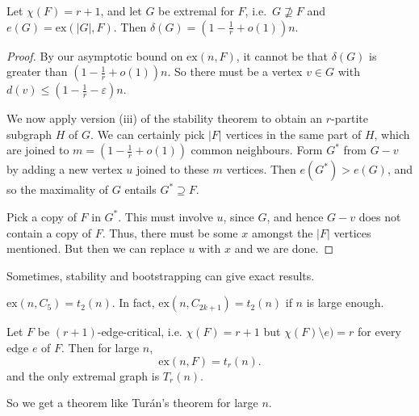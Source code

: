 \documentclass[a4paper]{article}
\renewcommand\ex{\mathrm{ex}}
\begin{document}
\begin{cor}
  Let $\chi(F) = r + 1$, and let $G$ be extremal for $F$, i.e.\ $G \not\supseteq F$ and $e(G) = \ex(|G|, F)$. Then $\delta(G) = \left(1 - \frac{1}{r} + o(1)\right)n$.
\end{cor}

\begin{proof}
  By our asymptotic bound on $\ex(n, F)$, it cannot be that $\delta(G)$ is greater than $\left(1 - \frac{1}{r} + o(1)\right)n$. So there must be a vertex $v \in G$ with $d(v) \leq \left(1 - \frac{1}{r} - \varepsilon\right) n$.

  We now apply version (iii) of the stability theorem to obtain an $r$-partite subgraph $H$ of $G$. We can certainly pick $|F|$ vertices in the same part of $H$, which are joined to $m = \left(1 - \frac{1}{r} + o(1)\right)$ common neighbours. Form $G^*$ from $G - v$ by adding a new vertex $u$ joined to these $m$ vertices. Then $e(G^*) > e(G)$, and so the maximality of $G$ entails $G^* \supseteq F$.

  Pick a copy of $F$ in $G^*$. This must involve $u$, since $G$, and hence $G - v$ does not contain a copy of $F$. Thus, there must be some $x$ amongst the $|F|$ vertices mentioned. But then we can replace $u$ with $x$ and we are done.
\end{proof}

Sometimes, stability and bootstrapping can give exact results.

\begin{eg}
  $\ex(n, C_5) = t_2(n)$. In fact, $\ex(n, C_{2k + 1}) = t_2(n)$ if $n$ is large enough.
\end{eg}

\begin{thm}[Simonovits]
  Let $F$ be $(r + 1)$-edge-critical, i.e. $\chi(F) = r + 1$ but $\chi(F) \setminus e) = r$ for every edge $e$ of $F$. Then for large $n$,
  \[
    \ex(n, F) = t_r(n).
  \]
  and the only extremal graph is $T_r(n)$.
\end{thm}
So we get a theorem like Tur\'an's theorem for large $n$.
\end{document}
